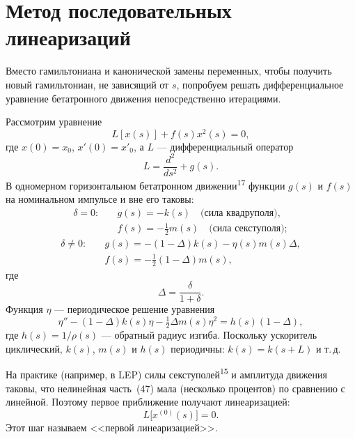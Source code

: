 \documentclass[11pt,a4paper]{article}
\begin{document}
\section{Метод последовательных линеаризаций}

Вместо гамильтониана и канонической замены переменных, чтобы получить новый
гамильтониан, не зависящий от $s$, попробуем решать дифференциальное уравнение
бетатронного движения непосредственно итерациями.

Рассмотрим уравнение
\begin{equation}
L[x(s)]+f(s)x^2(s)=0,
\end{equation}
где $x(0)=x_0$, $x'(0)=x'_0$, а $L$ --- дифференциальный оператор
\begin{equation}
L=\frac{d^2}{ds^2}+g(s).
\end{equation}
В одномерном горизонтальном бетатронном движении\textsuperscript{17} функции
$g(s)$ и $f(s)$ на номинальном импульсе и вне его таковы:
\begin{align}
\delta=0:&\quad
g(s)=-k(s)\quad\text{(сила квадруполя)},\nonumber\\
&\quad f(s)=-\tfrac12 m(s)\quad\text{(сила секступоля)};
\end{align}
\begin{align}
\delta\neq 0:&\quad
g(s)=-(1-\Delta)k(s)-\eta(s)m(s)\Delta,\nonumber\\
&\quad f(s)=-\tfrac12(1-\Delta)m(s),
\end{align}
где
\begin{equation}
\Delta=\frac{\delta}{1+\delta}.
\end{equation}
Функция $\eta$ --- периодическое решение уравнения
\begin{equation}
\eta''-(1-\Delta)k(s)\eta-\tfrac12\Delta m(s)\eta^2=h(s)(1-\Delta),
\end{equation}
где $h(s)=1/\rho(s)$ --- обратный радиус изгиба. Поскольку ускоритель циклический,
$k(s)$, $m(s)$ и $h(s)$ периодичны: $k(s)=k(s+L)$ и т.\,д.

На практике (например, в LEP) силы секступолей\textsuperscript{15} и амплитуда
движения таковы, что нелинейная часть~(47) мала (несколько процентов) по
сравнению с линейной. Поэтому первое приближение получают линеаризацией:
\begin{equation}
L\bigl[x^{(0)}(s)\bigr]=0.
\end{equation}
Этот шаг называем <<первой линеаризацией>>.
\end{document}
